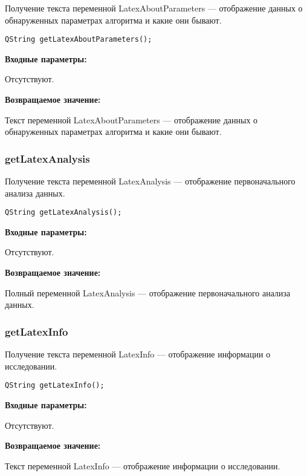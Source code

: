 \documentclass[a4paper,12pt]{article}
\begin{document}
Получение текста переменной LatexAboutParameters --- отображение данных о обнаруженных параметрах алгоритма и какие они бывают.


\begin{lstlisting}[label=code_syntax_getLatexAboutParameters,caption=Синтаксис]
QString getLatexAboutParameters();
\end{lstlisting}

\textbf{Входные параметры:}

Отсутствуют.

\textbf{Возвращаемое значение:}

Текст переменной LatexAboutParameters --- отображение данных о обнаруженных параметрах алгоритма и какие они бывают.


\subsubsection{getLatexAnalysis}\label{getLatexAnalysis}

Получение текста переменной LatexAnalysis --- отображение первоначального анализа данных.


\begin{lstlisting}[label=code_syntax_getLatexAnalysis,caption=Синтаксис]
QString getLatexAnalysis();
\end{lstlisting}

\textbf{Входные параметры:}

Отсутствуют.

\textbf{Возвращаемое значение:}

Полный переменной LatexAnalysis --- отображение первоначального анализа данных.


\subsubsection{getLatexInfo}\label{getLatexInfo}

Получение текста переменной LatexInfo --- отображение информации о исследовании.


\begin{lstlisting}[label=code_syntax_getLatexInfo,caption=Синтаксис]
QString getLatexInfo();
\end{lstlisting}

\textbf{Входные параметры:}

Отсутствуют.

\textbf{Возвращаемое значение:}

Текст переменной LatexInfo --- отображение информации о исследовании.
\end{document}

